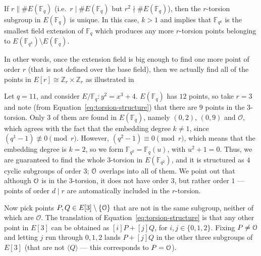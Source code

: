 

If $r \| \#E(\mathbb{F}_q)$ (i.e.\ $r \mid \#E(\mathbb{F}_q)$ but
$r^2 \nmid \#E(\mathbb{F}_q)$), then the $r$-torsion subgroup in
$E(\mathbb{F}_q)$ is unique. In this case, $k > 1$ and
 implies that $\mathbb{F}_{q^k}$ is the smallest
field extension of $\mathbb{F}_q$ which produces any more $r$-torsion points
belonging to $E(\mathbb{F}_{q^k}) \setminus E(\mathbb{F}_q)$. 

In other words, once the extension field is big enough to find one more point of order $r$ (that
is not defined over the base field), then we actually find all of the points in
$E[r] \cong \mathbb{Z}_r \times \mathbb{Z}_r$ as illustrated in 

\begin{example}\label{ex:4.1.1}
	
	
	Let $q = 11$, and consider $E/\mathbb{F}_q : y^2 = x^3 + 4$. $E(\mathbb{F}_q)$
	has $12$ points, so take $r = 3$ and note (from Equation~\eqref{eq:torsion-structure})
	that there are $9$ points in the $3$-torsion. Only $3$ of them are found in
	$E(\mathbb{F}_q)$, namely $(0, 2)$, $(0, 9)$ and $\mathcal{O}$, which agrees
	with the fact that the embedding degree $k \neq 1$, since
	$(q^1 - 1) \not\equiv 0 \pmod{r}$. However, $(q^2 - 1) \equiv 0 \pmod{r}$,
	which means that the embedding degree is $k = 2$, so we form
	$\mathbb{F}_{q^2} = \mathbb{F}_q(u)$, with $u^2 + 1 = 0$. Thus, we are
	guaranteed to find the whole $3$-torsion in $E(\mathbb{F}_{q^2})$, and it is
	structured as $4$ cyclic subgroups of order $3$; $\EuScript{O}$ overlaps into
	all of them. We point out that although $\EuScript{O}$ is in the $3$-torsion,
	it does not have order $3$, but rather order $1$ --- points of order $d \mid r$
	are automatically included in the $r$-torsion.
	
	Now pick points $P, Q \in E[3] \setminus \{\EuScript{O}\}$ that are not in the
	same subgroup, neither of which are $\mathcal{O}$. The translation of
	Equation~\eqref{eq:torsion-structure} is that any other point in $E[3]$ can be
	obtained as $[i]P + [j]Q$, for $i, j \in \{0, 1, 2\}$. Fixing $P \neq
	\EuScript{O}$ and letting $j$ run through $0, 1, 2$ lands $P + [j]Q$ in the
	other three subgroups of $E[3]$ (that are not $\langle Q \rangle$ --- this
	corresponds to $P = \EuScript{O}$).
	\label{example:findtorsionsubgroups}
\end{example}

